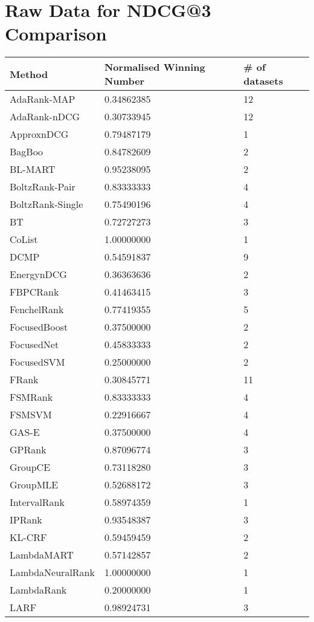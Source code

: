 \chapter{Raw Data for NDCG@3 Comparison}
\label{app:norm_winnum_ndcg3}

\begin{longtable}{l|l|l}
Method & Normalised Winning Number & \# of datasets \\
\hline
AdaRank-\acs{MAP} & 0.34862385 & 12 \\ 
AdaRank-\acs{nDCG} & 0.30733945 & 12 \\ 
Approx\acs{nDCG} & 0.79487179 & 1 \\ 
BagBoo & 0.84782609 & 2 \\ 
BL-MART & 0.95238095 & 2 \\ 
BoltzRank-Pair & 0.83333333 & 4 \\ 
BoltzRank-Single & 0.75490196 & 4 \\ 
BT & 0.72727273 & 3 \\ 
CoList & 1.00000000 & 1 \\ 
DCMP & 0.54591837 & 9 \\ 
Energy\acs{nDCG} & 0.36363636 & 2 \\ 
FBPCRank & 0.41463415 & 3 \\ 
FenchelRank & 0.77419355 & 5 \\ 
FocusedBoost & 0.37500000 & 2 \\ 
FocusedNet & 0.45833333 & 2 \\ 
Focused\acs{SVM} & 0.25000000 & 2 \\ 
FRank & 0.30845771 & 11 \\ 
FSMRank & 0.83333333 & 4 \\ 
FSM\acs{SVM} & 0.22916667 & 4 \\ 
GAS-E & 0.37500000 & 4 \\ 
\acs{GP}Rank & 0.87096774 & 3 \\ 
GroupCE & 0.73118280 & 3 \\ 
Group\acs{MLE} & 0.52688172 & 3 \\ 
IntervalRank & 0.58974359 & 1 \\ 
\acs{IP}Rank & 0.93548387 & 3 \\ 
KL-\acs{CRF} & 0.59459459 & 2 \\ 
LambdaMART & 0.57142857 & 2 \\ 
LambdaNeuralRank & 1.00000000 & 1 \\ 
LambdaRank & 0.20000000 & 1 \\ 
LARF & 0.98924731 & 3 \\ 

\end{longtable}
